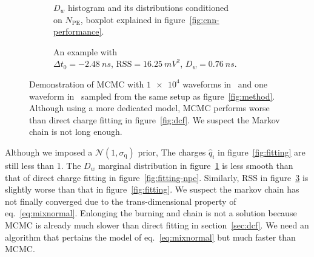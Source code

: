 \begin{figure}[H]
  \begin{subfigure}{.5\textwidth}
    \centering
    \resizebox{\textwidth}{!}{}
    \caption{\label{fig:mcmc-npe} $D_w$ histogram and its distributions conditioned \\ on $N_{\mathrm{PE}}$, boxplot explained in figure~\ref{fig:cnn-performance}.}
  \end{subfigure}
  \begin{subfigure}{.5\textwidth}
    \centering
    \resizebox{\textwidth}{!}{}
    \caption{\label{fig:mcmc}An example with \\ $\Delta{t_0}=\SI{-2.48}{ns}$, $\mathrm{RSS}=\SI{16.25}{mV^2}$, $D_w=\SI{0.76}{ns}$.}
  \end{subfigure}
  \caption{Demonstration of MCMC with $\num[retain-unity-mantissa=false]{1e4}$ waveforms in~ and one waveform in~ sampled from the same setup as figure~\ref{fig:method}.  Although using a more dedicated model, MCMC performs worse than direct charge fitting in figure~\ref{fig:dcf}. We suspect the Markov chain is not long enough.}
\end{figure}
Although we imposed a $\mathcal{N}(1, \sigma_\mathrm{q})$ prior, The charges $\hat{q}_i$ in figure~\ref{fig:fitting} are still less than 1.  The $D_w$ marginal distribution in figure~\ref{fig:mcmc-npe} is less smooth than that of direct charge fitting in figure~\ref{fig:fitting-npe}.  Similarly, RSS in figure~\ref{fig:mcmc} is slightly worse than that in figure~\ref{fig:fitting}.  We suspect the markov chain has not finally converged due to the trans-dimensional property of eq.~\eqref{eq:mixnormal}.  Enlonging the burning and chain is not a solution because MCMC is already much slower than direct fitting in section~\ref{sec:dcf}.  We need an algorithm that pertains the model of eq.~\eqref{eq:mixnormal} but much faster than MCMC.

